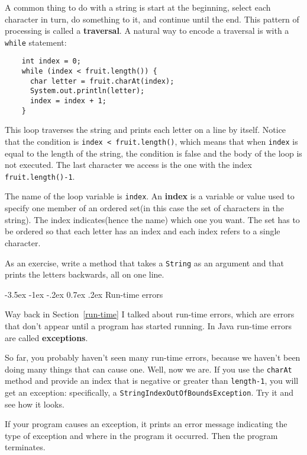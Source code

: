 \documentclass{book}
\makeatletter
\renewcommand{\section}{\@startsection 
    {section} {1} {0mm}%
    {-3.5ex \@plus -1ex \@minus -.2ex}%
    {0.7ex \@plus.2ex}%
    {\normalfont\Large\bfseries}}
\makeatother
\begin{document}
A common thing to do with a string is
start at the beginning, select each character in turn, do
something to it, and continue until the end.  This pattern
of processing is called a {\bf traversal}.  A natural
way to encode a traversal is with a {\tt while} statement:

\begin{verbatim}
    int index = 0;
    while (index < fruit.length()) {
      char letter = fruit.charAt(index);
      System.out.println(letter);
      index = index + 1;
    }
\end{verbatim}
%
This loop traverses the string and prints each letter on
a line by itself.  Notice that the condition is
{\tt index < fruit.length()}, which means that when
{\tt index} is equal to the length of the string, the
condition is false and the body of the loop is not executed.
The last character we access is the one with the
index {\tt fruit.length()-1}.


The name of the loop variable is {\tt index}.  An {\bf
index} is a variable or value used to specify one member of an ordered
set(in this case the set of characters in the string).  The index
indicates(hence the name) which one you want.  The set has to be
ordered so that each letter has an index and each index
refers to a single character.

As an exercise, write a method that takes a {\tt String}
as an argument and that prints the letters backwards, all on
one line.


\section{Run-time errors}

Way back in Section~\ref{run-time} I talked about run-time errors,
which are errors that don't appear until a program has started
running.  In Java run-time errors are called {\bf exceptions}.

So far, you probably haven't seen many run-time errors, because we
haven't been doing many things that can cause one.  Well, now we are.
If you use the {\tt charAt} method and provide an index that is
negative or greater than {\tt length-1}, you will get an exception:
specifically, a {\tt StringIndexOutOfBoundsException}.  Try it
and see how it looks.

If your program causes an exception, it prints an error message
indicating the type of exception and where in the program it
occurred.  Then the program terminates.
\end{document}
